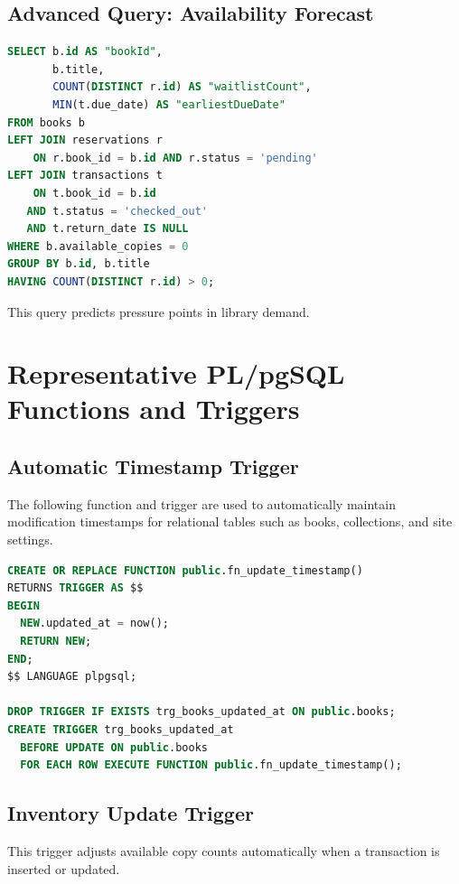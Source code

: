 \documentclass[12pt,a4paper]{report}
\begin{document}
\subsection{Advanced Query: Availability Forecast}
\begin{lstlisting}[language=SQL]
SELECT b.id AS "bookId",
       b.title,
       COUNT(DISTINCT r.id) AS "waitlistCount",
       MIN(t.due_date) AS "earliestDueDate"
FROM books b
LEFT JOIN reservations r
    ON r.book_id = b.id AND r.status = 'pending'
LEFT JOIN transactions t
    ON t.book_id = b.id
   AND t.status = 'checked_out'
   AND t.return_date IS NULL
WHERE b.available_copies = 0
GROUP BY b.id, b.title
HAVING COUNT(DISTINCT r.id) > 0;
\end{lstlisting}
This query predicts pressure points in library demand.

\section{Representative PL/pgSQL Functions and Triggers}
\subsection{Automatic Timestamp Trigger}
The following function and trigger are used to automatically maintain modification timestamps for relational tables such as books, collections, and site settings.

\begin{lstlisting}[language=SQL]
CREATE OR REPLACE FUNCTION public.fn_update_timestamp()
RETURNS TRIGGER AS $$
BEGIN
  NEW.updated_at = now();
  RETURN NEW;
END;
$$ LANGUAGE plpgsql;

DROP TRIGGER IF EXISTS trg_books_updated_at ON public.books;
CREATE TRIGGER trg_books_updated_at
  BEFORE UPDATE ON public.books
  FOR EACH ROW EXECUTE FUNCTION public.fn_update_timestamp();
\end{lstlisting}

\subsection{Inventory Update Trigger}
This trigger adjusts available copy counts automatically when a transaction is inserted or updated.
\end{document}
